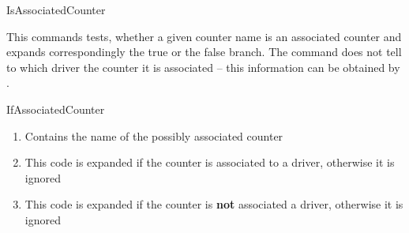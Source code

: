 \documentclass[12pt,paper=a4]{ltxdoc}
\begin{document}
\begin{docCommand}{IsAssociatedCounter}{}%

This commands tests, whether a given counter name is an associated counter and expands correspondingly the true or the false branch. The command does not tell to which driver the counter it is associated -- this information can be obtained by . 

\begin{docCommandArgs}{IfAssociatedCounter}%

\begin{enumerate}[label={\textcolor{blue}{\#\arabic*}}]
\item {}%

  Contains the name of the possibly associated counter

\item {}

  This code is expanded if the counter is associated to a driver, otherwise it is ignored

\item {}

  This code is expanded if the counter is \textbf{not} associated a  driver, otherwise it is ignored

\end{enumerate}
\end{docCommandArgs}


\begin{dispExample}
\end{dispExample}

\end{docCommand}%
\end{document}
